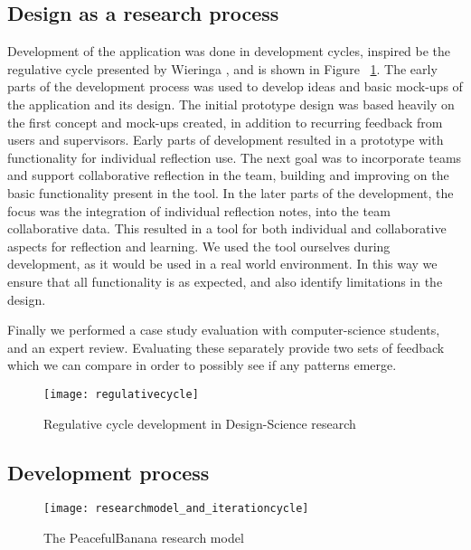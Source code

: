 \subsection{Design as a research process}
Development of the application was done in development cycles, inspired be the regulative cycle presented by Wieringa \citep{wieringa}, and is shown in Figure ~\ref{regulativecycle}. 
The early parts of the development process was used to develop ideas and basic mock-ups of the application and its design. The initial prototype design was based heavily on the first concept and mock-ups created, in addition to recurring feedback from users and supervisors. Early parts of development resulted in a prototype with functionality for individual reflection use. The next goal was to incorporate teams and support collaborative reflection in the team, building and improving on the basic functionality present in the tool. In the later parts of the development, the focus was the integration of individual reflection notes, into the team collaborative data. This resulted in a tool for both individual and collaborative aspects for reflection and learning. We used the tool ourselves during development, as it would be used in a real world environment. In this way we ensure that all functionality is as expected, and also identify limitations in the design. 

Finally we performed a case study evaluation with computer-science students, and an expert review. Evaluating these separately provide two sets of feedback which we can compare in order to possibly see if any patterns emerge. 
\begin{figure}[!htpb]
\centering
	\texttt{[image: regulativecycle]}
\caption{Regulative cycle development in Design-Science research \citep{wieringa}}
\label{regulativecycle}
\end{figure}

\subsection{Development process}
\begin{figure}[!htpb]
\centering
	\texttt{[image: researchmodel\_and\_iterationcycle]}
\caption{The PeacefulBanana research model }
\label{researchmodel}
\end{figure}

